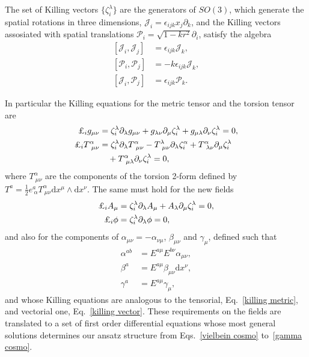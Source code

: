 \documentclass[aps,prd,12pt,superscriptaddress,showpacs,showkeys,longbibliography,reprint,nofootinbib]{revtex4-1}
\begin{document}
The set of Killing vectors $\{\zeta^\lambda_i\}$ are the generators of $SO(3)$, which generate the spatial rotations in three dimensions, $\mathcal{J}_i=\epsilon_{ijk}x_j\partial_k$, and the Killing vectors assosiated with spatial translations $\mathcal{P}_i=\sqrt{1-kr^2}\partial_i$, satisfy the algebra
\begin{align*}
  \left[\mathcal{J}_i,\mathcal{J}_j\right]&=\epsilon_{ijk}\mathcal{J}_k,\\
  \left[\mathcal{P}_i,\mathcal{P}_j\right]&=-k\epsilon_{ijk}\mathcal{J}_k,\\
  \left[\mathcal{J}_i,\mathcal{P}_j\right]&=\epsilon_{ijk}\mathcal{P}_k.
\end{align*}

In particular the Killing equations for the metric tensor and the torsion tensor are
\begin{align}
  \label{killing metric}
  \text{\textsterling}_i g_{\mu\nu}&=\zeta^\lambda_i\partial_\lambda g_{\mu\nu} + g_{\lambda\nu}\partial_\mu\zeta^\lambda_i  + g_{\mu\lambda}\partial_\nu\zeta^\lambda_i = 0,
  \\
  \text{\textsterling}_i T^\alpha_{\ \mu\nu}&=\zeta^\lambda_i\partial_\lambda T^\alpha_{\ \mu\nu} - T^\lambda_{\ \mu\nu} \partial_\lambda \zeta^\alpha_i + T^\alpha_{\ \lambda\nu} \partial_\mu\zeta^\lambda_i  \notag \\
  &\quad + T^\alpha_{\ \mu\lambda} \partial_\nu\zeta^\lambda_i = 0,
\end{align}
where $T^\alpha_{\ \mu\nu}$ are the components of the torsion 2-form defined by $T^a=\frac{1}{2}e^a_{\ \alpha}T^\alpha_{\ \mu\nu}\mbox{d}x^\mu\wedge\mbox{d}x^\nu$. The same must hold for the new fields
\begin{align}
  \label{killing vector}
  \text{\textsterling}_i A_\mu&=\zeta^\lambda_i\partial_\lambda A_\mu + A_\lambda \partial_\mu\zeta^\lambda_i = 0,\\
  \text{\textsterling}_i \phi &=\zeta^\lambda_i\partial_\lambda\phi=0,
\end{align}
and also for the components of $\alpha_{\mu\nu}=-\alpha_{\nu\mu}$, $\beta_{\mu\nu}$ and $\gamma_\mu$, defined such that
\begin{align*}
  \alpha^{ab}&=E^{a\mu}E^{b\nu}\alpha_{\mu\nu},\\
  \beta^a&=E^{a\mu}\beta_{\mu\nu}\mbox{d}x^\nu,\\
  \gamma^a&=E^{a\mu}\gamma_\mu,
\end{align*} 
and whose Killing equations are analogous to the tensorial, Eq.~\eqref{killing metric}, and vectorial one, Eq.~\eqref{killing vector}. These requirements on the fields are translated to a set of first order differential equations whose most general solutions determines our ansatz structure from Eqs.~\eqref{vielbein cosmo} to~\eqref{gamma cosmo}. 
\end{document}
